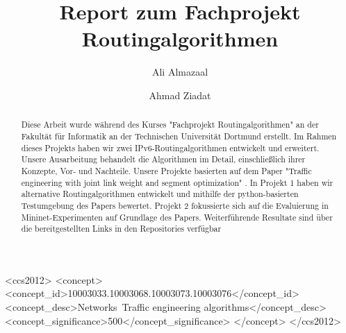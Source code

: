 \documentclass[sigconf, nonacm, review]{acmart}
\begin{document}
\title{Report zum Fachprojekt Routingalgorithmen}
\author{Ali Almazaal}

\author{Ahmad Ziadat}



\renewcommand{\shortauthors}{Almazaal, Ziadat,}

\begin{abstract}
Diese Arbeit wurde während des Kurses "Fachprojekt Routingalgorithmen" an der Fakultät für Informatik an der Technischen Universität Dortmund erstellt. Im Rahmen dieses Projekts haben wir zwei IPv6-Routingalgorithmen entwickelt und erweitert. Unsere Ausarbeitung behandelt die Algorithmen im Detail, einschließlich ihrer Konzepte, Vor- und Nachteile. Unsere Projekte basierten auf dem Paper "Traffic engineering with joint link weight and segment optimization" \cite{foerster2021}. In Projekt 1 haben wir alternative Routingalgorithmen entwickelt und mithilfe der python-basierten Testumgebung des Papers \cite{python-sim} bewertet. Projekt 2 fokussierte sich auf die Evaluierung in Mininet-Experimenten auf Grundlage des Papers\cite{nikolaussuess-nanonet}. Weiterführende Resultate sind über die bereitgestellten Links in den Repositories verfügbar

\end{abstract}

\begin{CCSXML}
<ccs2012>
<concept>
<concept_id>10003033.10003068.10003073.10003076</concept_id>
<concept_desc>Networks~Traffic engineering algorithms</concept_desc>
<concept_significance>500</concept_significance>
</concept>
</ccs2012>
\end{CCSXML}





\maketitle
\end{document}
